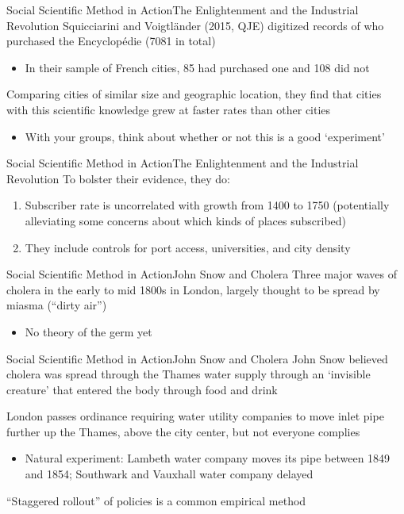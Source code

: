\documentclass[aspectratio=169,t,11pt,table]{beamer}
\begin{document}
\begin{frame}{Social Scientific Method in Action}{The Enlightenment and the Industrial Revolution}
  Squicciarini and Voigtländer (2015, QJE) digitized records of who purchased the Encyclopédie (7081 in total)
  \begin{itemize}
    \item In their sample of French cities, 85 had purchased one and 108 did not
  \end{itemize}
  
  \bigskip
  Comparing cities of similar size and geographic location, they find that cities with this scientific knowledge grew at faster rates than other cities
  \begin{itemize}
    \item With your groups, think about whether or not this is a good `experiment'  
  \end{itemize}
\end{frame}

\begin{frame}{Social Scientific Method in Action}{The Enlightenment and the Industrial Revolution}
  To bolster their evidence, they do:
  \begin{enumerate}
    \item Subscriber rate is uncorrelated with growth from 1400 to 1750 (potentially alleviating some concerns about which kinds of places subscribed)
    
    \item They include controls for port access, universities, and city density
  \end{enumerate}
\end{frame}

\begin{frame}{Social Scientific Method in Action}{John Snow and Cholera}
  Three major waves of cholera in the early to mid 1800s in London, largely thought to be spread by miasma (``dirty air'')
  \begin{itemize}
    \item No theory of the germ yet
  \end{itemize}
\end{frame}

\begin{frame}{Social Scientific Method in Action}{John Snow and Cholera}
  John Snow believed cholera was spread through the Thames water supply through an `invisible creature' that entered the body through food and drink
  
  \bigskip
  London passes ordinance requiring water utility companies to move inlet pipe further up the Thames, above the city center, but not everyone complies
  \begin{itemize}
    \item Natural experiment: Lambeth water company moves its pipe between 1849 and 1854; Southwark and Vauxhall water company delayed
  \end{itemize}

  \bigskip
  ``Staggered rollout'' of policies is a common empirical method
\end{frame}
\end{document}
